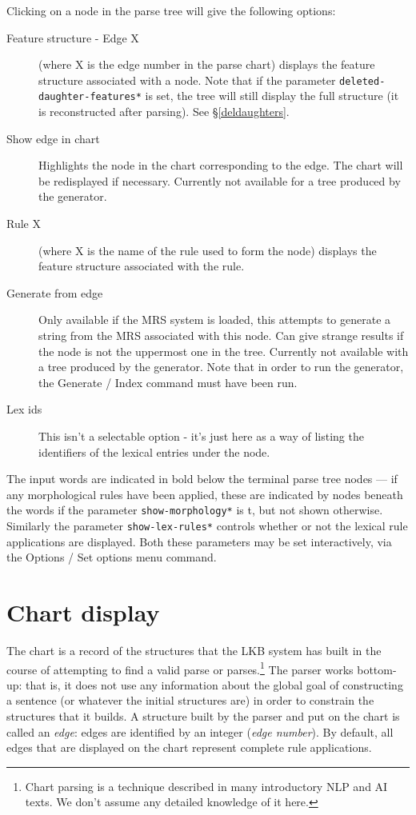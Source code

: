 \documentclass[12pt]{report}
\newcommand{\lkbparam}[1]{{\tt #1}}
\newcommand{\lkbmenucommand}{{\bf}}
\newcommand{\newterm}[1]{{\it #1}}
\begin{document}
Clicking on a node in the parse tree will
give the following options:
\begin{description}
\item [Feature structure - Edge X]  (where X is the edge number in the
parse chart) displays the feature structure associated
with a node.  Note that if the parameter
\lkbparam{*deleted-daughter-features*} is set, the tree will still
display the full structure (it is reconstructed after parsing).
See \S\ref{deldaughters}.
\item [Show edge in chart] Highlights the node in the chart corresponding to
the edge.  The chart will be redisplayed if necessary.
Currently not available for a tree produced by the generator.
\item [Rule X] (where X is the name of the
rule used to form the node) 
displays the feature structure associated with the rule.
\item[Generate from edge]  Only available if the MRS system
is loaded, this attempts to generate a string from the 
MRS associated with this node.  Can give strange results
if the node is not the uppermost one in the tree.
Currently not available with a tree produced by the generator.
Note that
in order to run the generator, 
the {\lkbmenucommand Generate} / {\lkbmenucommand Index}
command must have been run.
\item[Lex ids] This isn't a selectable option - it's just
here as a way of listing
the identifiers of the lexical entries under the node.
\end{description}

The input words are 
indicated in bold below the terminal parse tree nodes --- if any morphological
rules have been applied, these are indicated by nodes beneath the words
if the parameter \lkbparam{*show-morphology*} is t, but not shown otherwise.
Similarly the parameter \lkbparam{*show-lex-rules*} controls whether or
not the lexical rule applications are displayed.  Both these parameters
may be set interactively, via the 
{\lkbmenucommand Options} / {\lkbmenucommand Set options} 
menu command.

\section{Chart display}
\label{chart}

The chart is a record of the structures that the LKB system has built in
the course of attempting to find a valid parse or parses.\footnote{Chart
parsing is a technique
described in many introductory NLP and AI texts.  We don't assume any
detailed knowledge of it here.}
The parser works bottom-up: that is, it does not use any
information about the global goal of constructing a sentence (or
whatever the initial structures 
are) in order to constrain the structures that it
builds.  A structure built by the parser and put on the
chart is called an \newterm{edge}: edges are identified by an
integer (\newterm{edge number}).
By default, all edges that are displayed on the chart 
represent complete rule applications.
\end{document}
